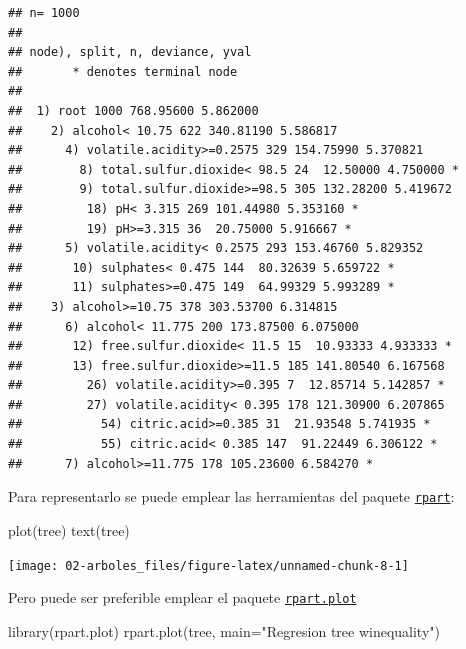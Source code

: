 \documentclass[
  spanish,
]{book}
\newenvironment{Shaded}{\begin{snugshade}}{\end{snugshade}}
\newcommand{\AttributeTok}[1]{\textcolor[rgb]{0.77,0.63,0.00}{#1}}
\newcommand{\FunctionTok}[1]{\textcolor[rgb]{0.00,0.00,0.00}{#1}}
\newcommand{\NormalTok}[1]{#1}
\newcommand{\StringTok}[1]{\textcolor[rgb]{0.31,0.60,0.02}{#1}}
\theoremstyle{break}
\theoremstyle{definition}
\theoremstyle{definition}
\theoremstyle{definition}
\theoremstyle{definition}
\theoremstyle{remark}
\begin{document}
\begin{verbatim}
## n= 1000 
## 
## node), split, n, deviance, yval
##       * denotes terminal node
## 
##  1) root 1000 768.95600 5.862000  
##    2) alcohol< 10.75 622 340.81190 5.586817  
##      4) volatile.acidity>=0.2575 329 154.75990 5.370821  
##        8) total.sulfur.dioxide< 98.5 24  12.50000 4.750000 *
##        9) total.sulfur.dioxide>=98.5 305 132.28200 5.419672  
##         18) pH< 3.315 269 101.44980 5.353160 *
##         19) pH>=3.315 36  20.75000 5.916667 *
##      5) volatile.acidity< 0.2575 293 153.46760 5.829352  
##       10) sulphates< 0.475 144  80.32639 5.659722 *
##       11) sulphates>=0.475 149  64.99329 5.993289 *
##    3) alcohol>=10.75 378 303.53700 6.314815  
##      6) alcohol< 11.775 200 173.87500 6.075000  
##       12) free.sulfur.dioxide< 11.5 15  10.93333 4.933333 *
##       13) free.sulfur.dioxide>=11.5 185 141.80540 6.167568  
##         26) volatile.acidity>=0.395 7  12.85714 5.142857 *
##         27) volatile.acidity< 0.395 178 121.30900 6.207865  
##           54) citric.acid>=0.385 31  21.93548 5.741935 *
##           55) citric.acid< 0.385 147  91.22449 6.306122 *
##      7) alcohol>=11.775 178 105.23600 6.584270 *
\end{verbatim}

Para representarlo se puede emplear las herramientas del paquete \href{https://CRAN.R-project.org/package=rpart}{\texttt{rpart}}:

\begin{Shaded}
\begin{Highlighting}[]
\FunctionTok{plot}\NormalTok{(tree)}
\FunctionTok{text}\NormalTok{(tree)}
\end{Highlighting}
\end{Shaded}

\begin{center}\texttt{[image: 02-arboles\_files/figure-latex/unnamed-chunk-8-1]} \end{center}

Pero puede ser preferible emplear el paquete \href{https://CRAN.R-project.org/package=rpart.plot}{\texttt{rpart.plot}}

\begin{Shaded}
\begin{Highlighting}[]
\FunctionTok{library}\NormalTok{(rpart.plot)}
\FunctionTok{rpart.plot}\NormalTok{(tree, }\AttributeTok{main=}\StringTok{"Regresion tree winequality"}\NormalTok{)  }
\end{Highlighting}
\end{Shaded}
\end{document}
